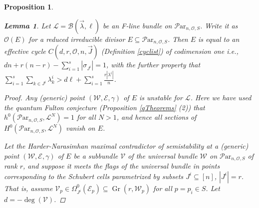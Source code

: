 \documentclass[11pt]{amsart}
\newcommand\me{\mathcal{E}}
\newcommand\mv{\mathcal{V}}
\newcommand\ml{\mathcal{L}}
\newcommand\mw{\mathcal{W}}
\newcommand\Par{\mathcal{P}\text{ar} }
\newcommand\Gr{\operatorname{Gr}}
\newtheorem{proposition}[theorem]{Proposition}
\newtheorem{lemma}[theorem]{Lemma}
\numberwithin{theorem}{subsection}
\begin{document}
{\begin{proposition}
\begin{lemma}\label{divisorE}
Let $\ml=\mathcal{B}(\vec{\lambda},\ell)$ be an F-line bundle on $\Par_{n,\mathcal{O},S}$. Write it as $\mathcal{O}(E)$ for a reduced irreducible divisor  $E\subseteq \Par_{n,\mathcal{O},S}$.
Then $E$ is equal to an effective cycle $C(d,r,\mathcal{O},n,\vec{J})$ (Definition  \ref{cyclist})  of codimension one i.e., $dn  +r(n-r)-\sum_{i=1}^s |\sigma_{J^i}|=1$, with the further property that
$\sum_{i=1}^s \sum_{k\in J^i} \lambda^i_k> d\ell +\sum_{i=1}^s \frac{r|\lambda^i|}{n}$.
\end{lemma}
\begin{proof}
Any (generic) point $(\mw,\me,\gamma)$ of $E$ is unstable for $\ml$. Here we have used the quantum Fulton conjecture (Proposition \ref{qTheorems} (2)) that $h^0(\Par_{n,{\mathcal{O}},S},\ml^N)=1$ for all $N>1$, and hence all sections of $H^0(\Par_{n,{\mathcal{O}},S},\ml^N)$ vanish on $E$.

Let the Harder-Narasimhan maximal contradictor of semistability at a (generic) point $(\mw,\me,\gamma)$ of $E$ be a subbundle $\mv$ of the universal bundle $\mw$ on  $\Par_{n,{\mathcal{O}},S}$ of rank $r$, and suppose it meets the flags of the universal bundle in points corresponding to the Schubert cells parametrized by subsets $J^i\subseteq[n]$, $|J^i|=r$. That is, assume  $\mv_p\in \Omega^0_{J^i}(\me_p)\subseteq \Gr(r,\mw_p)$ for all $p=p_i\in S$.  Let $d=-\deg(\mv)$.


\end{proof}
\end{proposition}}
\end{document}
